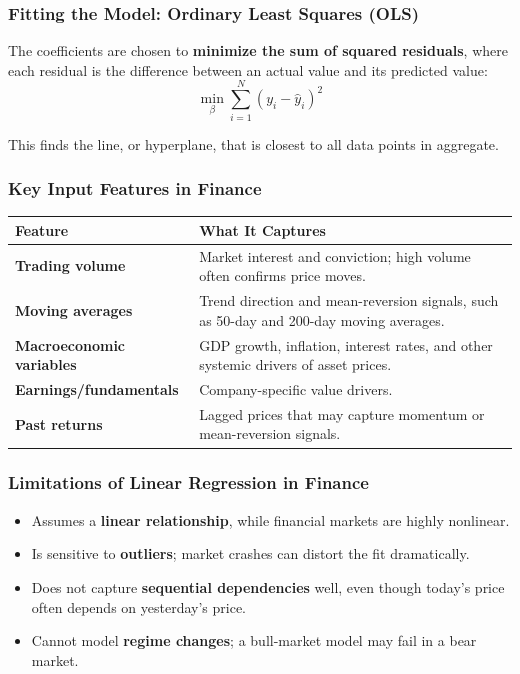 \documentclass[12pt,openany]{book}
\begin{document}
\subsubsection{Fitting the Model: Ordinary Least Squares (OLS)}

The coefficients are chosen to \textbf{minimize the sum of squared residuals}, where each residual is the difference between an actual value and its predicted value:
\begin{equation*}
    \min_{\beta} \sum_{i=1}^{N} \left( y_i - \hat{y}_i \right)^2
\end{equation*}

This finds the line, or hyperplane, that is closest to all data points in aggregate.

\subsubsection{Key Input Features in Finance}

\begin{center}
\scriptsize
\setlength{\tabcolsep}{3pt}
\begin{tabular}{|L{4.1cm}|L{8.1cm}|}
\hline
\textbf{Feature} & \textbf{What It Captures} \\
\hline
\textbf{Trading volume} & Market interest and conviction; high volume often confirms price moves. \\
\hline
\textbf{Moving averages} & Trend direction and mean-reversion signals, such as 50-day and 200-day moving averages. \\
\hline
\textbf{Macroeconomic variables} & GDP growth, inflation, interest rates, and other systemic drivers of asset prices. \\
\hline
\textbf{Earnings/fundamentals} & Company-specific value drivers. \\
\hline
\textbf{Past returns} & Lagged prices that may capture momentum or mean-reversion signals. \\
\hline
\end{tabular}
\end{center}

\subsubsection{Limitations of Linear Regression in Finance}

\begin{itemize}[leftmargin=*]
    \item Assumes a \textbf{linear relationship}, while financial markets are highly nonlinear.
    \item Is sensitive to \textbf{outliers}; market crashes can distort the fit dramatically.
    \item Does not capture \textbf{sequential dependencies} well, even though today's price often depends on yesterday's price.
    \item Cannot model \textbf{regime changes}; a bull-market model may fail in a bear market.
\end{itemize}
\end{document}
